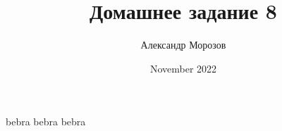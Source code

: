 \documentclass{article}
\title{Домашнее задание 8}
\author{Александр Морозов}
\date{November 2022}
\begin{document}
bebra bebra bebra
\end{document}
